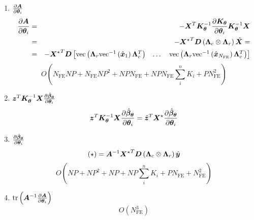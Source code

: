 \documentclass[10pt]{scrartcl}
\begin{document}
\begin{enumerate}

\item{
$\frac{\partial{\bm{A}}}{\partial\bm{\theta}_i}$
\begin{eqnarray}
\frac{\partial{\bm{A}}}{\partial\bm{\theta}_i} & = &
-\bm{X}^T\bm{K}_{\bm{\theta}}^{-1}\frac{\partial{\bm{K}_{\bm{\theta}}}}{\partial\bm{\theta}_i}\bm{K}_{\bm{\theta}}^{-1}\bm{X} \\
&=&
-{\bm{X}^\star}^T\bm{D}\left(\bm{\Lambda}_c\otimes\bm{\Lambda}_r\right)\hat{\bm{X}}= \\
&=&
-{\bm{X}^\star}^T\bm{D}
\begin{bmatrix}
\mathrm{vec}\left(\bm{\Lambda}_r\text{vec}^{-1}\left({\hat{\bm{x}}_1}\right)\bm{\Lambda}_c^T\right)
&\dots &
\mathrm{vec}\left(\bm{\Lambda}_r\text{vec}^{-1}\left({\hat{\bm{x}}_{N_\text{FE}}}\right)\bm{\Lambda}_c^T\right)
\end{bmatrix}
\end{eqnarray}
\begin{equation}
O(N_\text{FE}NP+N_\text{FE}NP^2+NPN_{\text{FE}}+NPN_\text{FE}\sum_i^nK_i+PN_\text{FE}^2)
\end{equation}
}

\item{
$\bm{z}^T\bm{K}_{\bm{\theta}}^{-1}\bm{X}\frac{\partial{\hat{\bm{\beta}}_{\bm{\theta}}}}{\partial\bm{\theta}_i}$
\begin{equation}
\bm{z}^T\bm{K}_{\bm{\theta}}^{-1}\bm{X}\frac{\partial{\hat{\bm{\beta}}_{\bm{\theta}}}}{\partial\bm{\theta}_i}=
{\hat{\bm{z}}}^T\bm{X}^\star\frac{\partial{\hat{\bm{\beta}}_{\bm{\theta}}}}{\partial\bm{\theta}_i}
\end{equation}
}

\item{
$\frac{\partial{\hat{\bm{\beta}}_{\bm{\theta}}}}{\partial\bm{\theta}_i}$
\begin{equation}
(\star)=\bm{A}^{-1}{\bm{X}^\star}^T\bm{D}\left(\bm{\Lambda}_c\otimes\bm{\Lambda}_r\right)\hat{\bm{y}}
\end{equation}
\begin{equation}
O(NP+NP^2+NP+NP\sum_i^nK_i+PN_\text{FE}+N_\text{FE}^2)
\end{equation}
}

\item{
$\text{tr}\left(\bm{A}^{-1}\frac{\partial{\bm{A}}}{\partial\bm{\theta}_i}\right)$
\begin{equation}
O(N_\text{FE}^3)
\end{equation}
}

\end{enumerate}
\end{document}
